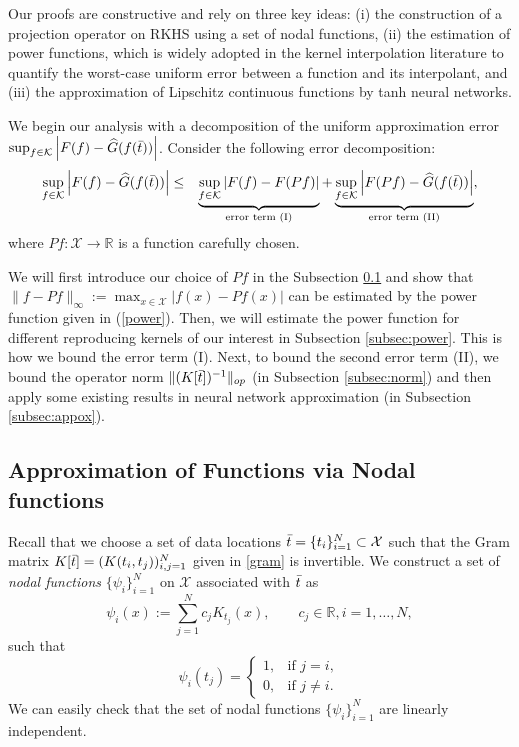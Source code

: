 \documentclass{article}
\def\RR{\mathbb R}
\numberwithin{equation}{section}
\begin{document}
Our proofs are constructive and rely on three key ideas: (i) the construction of a projection operator on RKHS using a set of nodal functions, (ii) the estimation of power functions, which is widely adopted in the kernel interpolation literature to quantify the worst-case uniform error between a function and its interpolant, and (iii) the approximation of Lipschitz continuous functions by tanh
neural networks.

We begin our analysis with a decomposition of the uniform approximation error $\sup_{f\in \mathcal{K}} \left|F(f) - \widehat{G}(f(\Bar{t}))\right|$.
Consider the following error decomposition:
\begin{eqnarray}\label{decomposition}
         \sup_{f\in \mathcal{K}}\left| F(f) - \widehat{G}(f(\Bar{t}))\right| &\leq& 
         \underbrace{\sup_{f\in \mathcal{K}}| F(f) - F(Pf)|}_{\text{error term (I)}} +  \underbrace{\sup_{f\in \mathcal{K}}\left|F(Pf) - \widehat{G}(f(\Bar{t}))\right|}_{\text{error term (II)}}, 
\end{eqnarray}
where $Pf: \mathcal{X} \to \RR$ is a function carefully chosen. 
    
We will first introduce our choice of $Pf$ in the Subsection \ref{subsec:nodal} and show that $\|f-Pf\|_\infty:= \max_{x\in \mathcal{X}}|f(x) - Pf(x)|$ can be estimated by the power function given in (\ref{power}). 
Then, we will estimate the power function for different reproducing kernels of our interest in Subsection \ref{subsec:power}. 
This is how we bound the error term (I). 
Next, to bound the second error term (II), we bound the operator norm $\|(K[\Bar{t}])^{-1 }\|_{op}$ (in Subsection \ref{subsec:norm}) and then apply some existing results in neural network approximation (in Subsection \ref{subsec:appox}).
 
    
\subsection{Approximation of Functions via Nodal functions}\label{subsec:nodal}

Recall that we choose a set of data locations $\Bar{t}=\{t_i\}_{i=1}^N \subset \mathcal{X}$  such that the Gram matrix $K[\Bar{t} ] = (K(t_i, t_j))_{i,j=1}^N$ given in \eqref{gram} is invertible.  We construct a set of \textit{nodal functions} $\{\psi_i\}_{i=1}^N$ on $\mathcal{X}$ associated with $\Bar{t}$ as 
\begin{equation}
    \psi_i(x) := \sum_{j=1}^N c_j K_{t_j}(x),\qquad   c_j\in \RR,i=1,\ldots, N ,
\end{equation}
such that 
\begin{equation*}
    \psi_i(t_j) = \begin{cases}
      1, & \text{if } j=i,\\
      0, & \text{if } j \neq i.
    \end{cases}
\end{equation*}
We can easily check that the set of nodal functions  $\{\psi_i\}_{i=1}^N$ are linearly independent.
\end{document}
